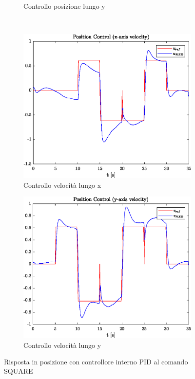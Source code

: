 \begin{figure}
\begin{subfigure}{0.45\textwidth}
		\caption{Controllo posizione lungo y}
	\end{subfigure}
	\\
	\begin{subfigure}{0.45\textwidth}
		\centering
		\includegraphics[width=1\textwidth]{Simulazioni/Figure/PID/SQUARE/PositionControlXVel}
		\caption{Controllo velocità lungo x}
	\end{subfigure}
	\hfill
	\begin{subfigure}{0.45\textwidth}
		\centering
		\includegraphics[width=1\textwidth]{Simulazioni/Figure/PID/SQUARE/PositionControlYVel}
		\caption{Controllo velocità lungo y}
	\end{subfigure}
	\caption{Risposta in posizione con controllore interno PID al comando SQUARE}
\end{figure}

